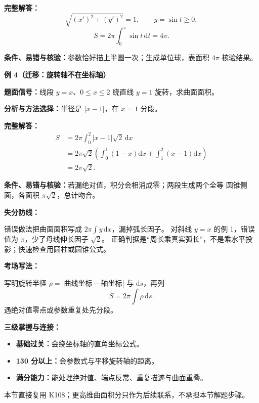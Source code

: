 \begin{knowledgeBox}
\textbf{完整解答：}
\[
\sqrt{(x')^2+(y')^2}=1,\qquad y=\sin t\ge0,
\]
\[
S=2\pi\int_0^\pi\sin t\,\mathrm dt=4\pi.
\]

\textbf{条件、易错与核验：}参数恰好描上半圆一次；生成单位球，表面积
\(4\pi\) 核验结果。

\textbf{例 4（迁移：旋转轴不在坐标轴）}

\textbf{题面信号：}线段 \(y=x\)、\(0\le x\le2\) 绕直线 \(y=1\)
旋转，求曲面面积。

\textbf{分析与方法选择：}半径是 \(|x-1|\)，在 \(x=1\) 分段。

\textbf{完整解答：}
\[
\begin{aligned}
S&=2\pi\int_0^2|x-1|\sqrt2\,\mathrm dx\\
&=2\pi\sqrt2\left(\int_0^1(1-x)\mathrm dx
+\int_1^2(x-1)\mathrm dx\right)\\
&=2\pi\sqrt2.
\end{aligned}
\]

\textbf{条件、易错与核验：}若漏绝对值，积分会相消成零；两段生成两个全等
圆锥侧面，各面积 \(\pi\sqrt2\)，总计吻合。

\textbf{失分防线：}

错误做法把曲面面积写成 \(2\pi\int y\,\mathrm dx\)，漏掉弧长因子。
对斜线 \(y=x\) 的例 1，错误值为 \(\pi\)，少了母线伸长因子 \(\sqrt2\)。
正确判据是“周长乘真实弧长”，不是乘水平投影；快速检查用圆柱或圆锥公式。

\textbf{考场写法：}

写明旋转半径 \(\rho=|\text{曲线坐标}-\text{轴坐标}|\) 与
\(\mathrm ds\)，再列
\[
S=2\pi\int\rho\,\mathrm ds.
\]
遇绝对值零点或参数重复处先分段。

\textbf{三级掌握与连接：}
\begin{itemize}
  \item \textbf{基础过关：}会绕坐标轴的直角坐标公式。
  \item \textbf{130 分以上：}会参数式与平移旋转轴的距离。
  \item \textbf{满分能力：}能处理绝对值、端点反常、重复描迹与曲面重叠。
\end{itemize}
本节直接复用 K108；更高维曲面积分只作为后续联系，不承担本节解题步骤。
\end{knowledgeBox}
